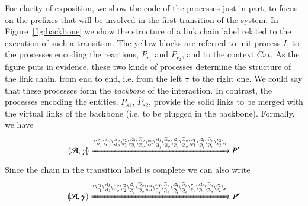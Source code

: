 \begin{example}
\[\begin{array}{rcl}
\end{array}
\]  \\
For clarity of exposition, we show the code of the processes just in part, to focus on the prefixes that will be involved in the first transition of the system. In Figure~\ref{fig:backbone} we show the  structure of a link chain label related to the execution of such a transition. The yellow blocks are referred to init process $I$, to the processes encoding the reactions, $P_{r_1}$ and $P_{r_2}$, and to the context $\mathit{Cxt}$. As the figure puts in evidence, these two kinds of processes determine the structure of the link chain, from end to end, i.e. from the left $\tau$ to the right one. We could say that these processes form the \emph{backbone} of the interaction.
   In contrast, the processes encoding the entities, $P_{s1}$,  $\overline{P}_{s2}$, provide the
    solid links to be merged with the virtual links of the backbone (i.e. to be plugged in the backbone).
 Formally, we have
 $$
 \llparenthesis{\cal A},\gamma\rrparenthesis \xrightarrow{
 {}^{\tau}
 \backslash_{r_1}^{r_1}
 \backslash_{s1_i}^{s1_i}
 \backslash_{s1_o}^{s1_o}
 \backslash_{r_2}^{r_2}
 \backslash_{\overline{s2}_i}^{\overline{s2}_i}
 \backslash_{\overline{s2}_o}^{\overline{s2}_o}
 \backslash_{\mathit{cxt}}^{\mathit{cxt}}
 \backslash_{\widehat{s1}_i}^{\widehat{s1}_i}
 \backslash_{\widehat{s1}_o}^{\widehat{s1}_o}
  \backslash_{\widehat{s2}_i}^{\widehat{s2}_i}
  \backslash_{\widehat{s2}_o}^{\widehat{s2}_o}
  \backslash_{p_1}^{p_1}
  \backslash_{\widetilde{s2}_i}^{\widetilde{s2}_i}
  \backslash_{\widetilde{s2}_o}^{\widetilde{s2}_o}
  \backslash_{p_2}^{p_2}
  \backslash_{\tau}
 }
 P'
 $$
 
 Since the chain in the transition label is complete we can also write
  $$
 \llparenthesis{\cal A},\gamma\rrparenthesis \xRightarrow{
 \ensuremath{{}^{\tau}}
 \ensuremath{\backslash_{r_1}^{r_1}}
 \ensuremath{\backslash_{s1_i}^{s1_i}}
 \ensuremath{\backslash_{s1_o}^{s1_o}}
 \ensuremath{\backslash_{r_2}^{r_2}}
 \ensuremath{\backslash_{\overline{s2}_i}^{\overline{s2}_i}}
 \ensuremath{\backslash_{\overline{s2}_o}^{\overline{s2}_o}}
 \ensuremath{\backslash_{\mathit{cxt}}^{\mathit{cxt}}}
 \ensuremath{\backslash_{\widehat{s1}_i}^{\widehat{s1}_i}}
 \ensuremath{\backslash_{\widehat{s1}_o}^{\widehat{s1}_o}}
  \ensuremath{\backslash_{\widehat{s2}_i}^{\widehat{s2}_i}}
  \ensuremath{\backslash_{\widehat{s2}_o}^{\widehat{s2}_o}}
  \ensuremath{\backslash_{p_1}^{p_1}}
  \ensuremath{\backslash_{\widetilde{s2}_i}^{\widetilde{s2}_i}}
  \ensuremath{\backslash_{\widetilde{s2}_o}^{\widetilde{s2}_o}}
  \ensuremath{\backslash_{p_2}^{p_2}}
  \ensuremath{\backslash_{\tau}}
 }
 P'
 $$

 
  \begin{figure}[t]
\end{figure}
\end{example}
